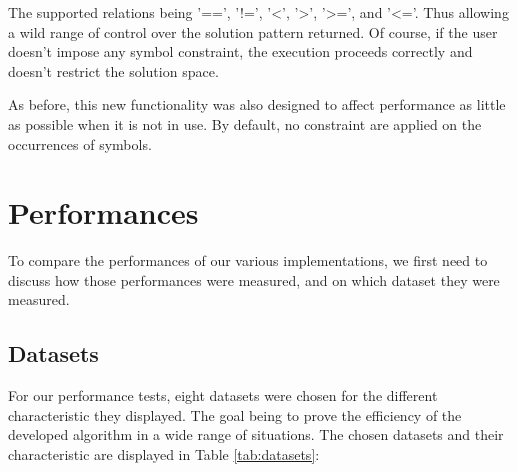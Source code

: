 \documentclass{eplmastersthesis}
\begin{document}
The supported relations being '==', '!=', '<', '>', '>=', and '<='. Thus allowing a wild range of control over the solution pattern returned. Of course, if the user doesn't impose any symbol constraint, the execution proceeds correctly and doesn't restrict the solution space. \newline

As before, this new functionality was also designed to affect performance as little as possible when it is not in use. By default, no constraint are applied on the occurrences of symbols.

\newpage
{}
\section{Performances}

To compare the performances of our various implementations, we first need to discuss how those performances were measured, and on which dataset they were measured.

\subsection{Datasets}

For our performance tests, eight datasets were chosen for the different characteristic they displayed. The goal being to prove the efficiency of the developed algorithm in a wide range of situations. The chosen datasets and their characteristic are displayed in Table \ref{tab:datasets}: \newline
\end{document}
